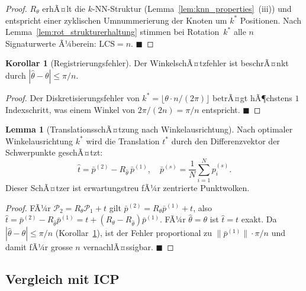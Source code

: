 ﻿\documentclass[a4paper,12pt]{article}
\theoremstyle{definition}
\newtheorem{lemma}{Lemma}[section]
\newtheorem{korollar}{Korollar}[section]
\begin{document}
\begin{proof}
  $R_\theta$ erhÃ¤lt die $k$-NN-Struktur
  (Lemma~\ref{lem:knn_properties}~(iii)) und entspricht einer
  zyklischen Umnummerierung der Knoten um $k^*$ Positionen.
  Nach Lemma~\ref{lem:rot_strukturerhaltung} stimmen bei
  Rotation~$k^*$ alle $n$ Signaturwerte Ã¼berein:
  $\mathrm{LCS} = n$. \hfill$\blacksquare$
\end{proof}

\begin{korollar}[Registrierungsfehler]
  \label{kor:reg_fehler}
  Der WinkelschÃ¤tzfehler ist beschrÃ¤nkt durch
  $|\hat\theta - \theta| \leq \pi / n$.
\end{korollar}

\begin{proof}
  Der Diskretisierungsfehler von $k^* = \lfloor \theta \cdot n /
  (2\pi) \rfloor$ betrÃ¤gt hÃ¶chstens $1$ Indexschritt, was einem
  Winkel von $2\pi / (2n) = \pi/n$ entspricht. \hfill$\blacksquare$
\end{proof}

\begin{lemma}[TranslationsschÃ¤tzung nach Winkelausrichtung]
  \label{lem:translation}
  Nach optimaler Winkelausrichtung $k^*$ wird die Translation
  $t^*$ durch den Differenzvektor der Schwerpunkte geschÃ¤tzt:
  \[
    \hat{t} = \bar{p}^{(2)} - R_{\hat\theta}\, \bar{p}^{(1)},
    \quad
    \bar{p}^{(s)} = \frac{1}{N}\sum_{i=1}^N p_i^{(s)}.
  \]
  Dieser SchÃ¤tzer ist erwartungstreu fÃ¼r zentrierte Punktwolken.
\end{lemma}

\begin{proof}
  FÃ¼r $\mathcal{P}_2 = R_\theta \mathcal{P}_1 + t$ gilt
  $\bar{p}^{(2)} = R_\theta \bar{p}^{(1)} + t$, also
  $\hat{t} = \bar{p}^{(2)} - R_{\hat\theta} \bar{p}^{(1)}
  = t + (R_\theta - R_{\hat\theta})\bar{p}^{(1)}$.
  FÃ¼r $\hat\theta = \theta$ ist $\hat{t} = t$ exakt. Da
  $|\hat\theta - \theta| \leq \pi/n$ (Korollar~\ref{kor:reg_fehler}),
  ist der Fehler proportional zu $\|\bar{p}^{(1)}\| \cdot \pi/n$
  und damit fÃ¼r grosse $n$ vernachlÃ¤ssigbar. \hfill$\blacksquare$
\end{proof}

\subsection{Vergleich mit ICP}
\end{document}
